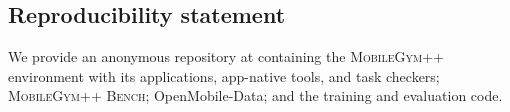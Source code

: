 \subsection*{Reproducibility statement}

We provide an anonymous repository at  containing the \textsc{MobileGym++} environment with its applications, app-native tools, and task checkers; \textsc{MobileGym++ Bench}; OpenMobile-Data; and the training and evaluation code. 
